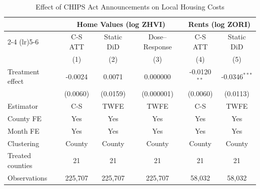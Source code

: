 \begin{table}[htbp]
\centering
\caption{Effect of CHIPS Act Announcements on Local Housing Costs}
\label{tab:main}
\begin{tabular}{l ccc cc}
\toprule
 & \multicolumn{3}{c}{Home Values (log ZHVI)} & \multicolumn{2}{c}{Rents (log ZORI)} \\
\cmidrule(lr){2-4} \cmidrule(lr){5-6}
 & C-S ATT & Static DiD & Dose--Response & C-S ATT & Static DiD \\
 & (1) & (2) & (3) & (4) & (5) \\
\midrule
Treatment effect & -0.0024 & 0.0071 & 0.000000 & -0.0120$^{**}$ & -0.0346$^{***}$ \\
 & (0.0060) & (0.0159) & (0.000001) & (0.0060) & (0.0113) \\
\midrule
Estimator & C-S & TWFE & TWFE & C-S & TWFE \\
County FE & Yes & Yes & Yes & Yes & Yes \\
Month FE & Yes & Yes & Yes & Yes & Yes \\
Clustering & County & County & County & County & County \\
Treated counties & 21 & 21 & 21 & 21 & 21 \\
Observations & 225,707 & 225,707 & 225,707 & 58,032 & 58,032 \\
\bottomrule
\end{tabular}
\par{}
\end{table}

